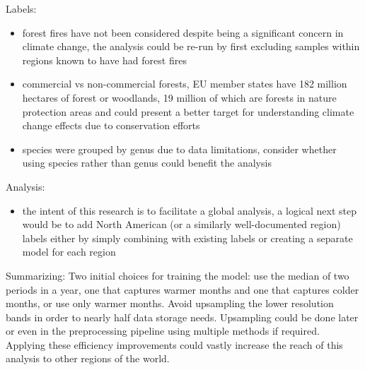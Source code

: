 Labels:
\begin{itemize}
    \item forest fires have not been considered despite being a significant concern in climate change, the analysis could be re-run by first excluding samples within regions known to have had forest fires
    \item commercial vs non-commercial forests, EU member states have 182 million hectares of forest or woodlands, 19 million of which are forests in nature protection areas and could present a better target for understanding climate change effects due to conservation efforts
    \item species were grouped by genus due to data limitations, consider whether using species rather than genus could benefit the analysis
\end{itemize}

Analysis:

\begin{itemize}
    \item the intent of this research is to facilitate a global analysis, a logical next step would be to add North American (or a similarly well-documented region) labels either by simply combining with existing labels or creating a separate model for each region
\end{itemize}


Summarizing:
Two initial choices for training the model: use the median of two periods in a year, one that captures warmer months and one that captures colder months, or use only warmer months. Avoid upsampling the lower resolution bands in order to nearly half data storage needs. Upsampling could be done later or even in the preprocessing pipeline using multiple methods if required. Applying these efficiency improvements could vastly increase the reach of this analysis to other regions of the world.
